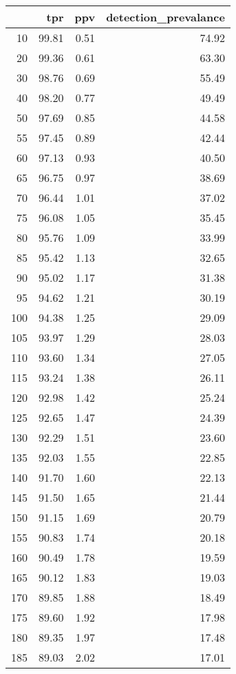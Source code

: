\begin{table}[ht]
\centering
\begin{tabular}{rrrr}
  \hline
 & tpr & ppv & detection\_prevalance \\ 
  \hline
 10 & 99.81 & 0.51 & 74.92 \\ 
   20 & 99.36 & 0.61 & 63.30 \\ 
   30 & 98.76 & 0.69 & 55.49 \\ 
   40 & 98.20 & 0.77 & 49.49 \\ 
   50 & 97.69 & 0.85 & 44.58 \\ 
   55 & 97.45 & 0.89 & 42.44 \\ 
   60 & 97.13 & 0.93 & 40.50 \\ 
   65 & 96.75 & 0.97 & 38.69 \\ 
   70 & 96.44 & 1.01 & 37.02 \\ 
   75 & 96.08 & 1.05 & 35.45 \\ 
   80 & 95.76 & 1.09 & 33.99 \\ 
   85 & 95.42 & 1.13 & 32.65 \\ 
   90 & 95.02 & 1.17 & 31.38 \\ 
   95 & 94.62 & 1.21 & 30.19 \\ 
  100 & 94.38 & 1.25 & 29.09 \\ 
  105 & 93.97 & 1.29 & 28.03 \\ 
  110 & 93.60 & 1.34 & 27.05 \\ 
  115 & 93.24 & 1.38 & 26.11 \\ 
  120 & 92.98 & 1.42 & 25.24 \\ 
  125 & 92.65 & 1.47 & 24.39 \\ 
  130 & 92.29 & 1.51 & 23.60 \\ 
  135 & 92.03 & 1.55 & 22.85 \\ 
  140 & 91.70 & 1.60 & 22.13 \\ 
  145 & 91.50 & 1.65 & 21.44 \\ 
  150 & 91.15 & 1.69 & 20.79 \\ 
  155 & 90.83 & 1.74 & 20.18 \\ 
  160 & 90.49 & 1.78 & 19.59 \\ 
  165 & 90.12 & 1.83 & 19.03 \\ 
  170 & 89.85 & 1.88 & 18.49 \\ 
  175 & 89.60 & 1.92 & 17.98 \\ 
  180 & 89.35 & 1.97 & 17.48 \\ 
  185 & 89.03 & 2.02 & 17.01 \\ 

\end{tabular}
\end{table}
